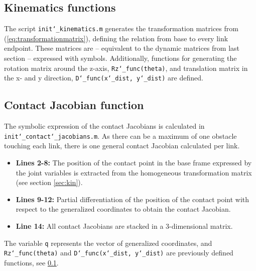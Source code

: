 \subsection{Kinematics functions}\label{subseq:kinfunc}

The script \texttt{init\char`_kinematics.m} generates the transformation matrices from (\ref{eq:transformationmatrix}), defining the relation from base to every link endpoint. These matrices are -- equivalent to the dynamic matrices from last section -- expressed with symbols. Additionally, functions for generating the rotation matrix around the z-axis, \texttt{Rz\char`_func(theta)}, and translation matrix in the x- and y direction, \texttt{D\char`_func(x\char`_dist, y\char`_dist)} are defined.


\subsection{Contact Jacobian function}\label{subseq:Jcfunc}
The symbolic expression of the contact Jacobians is calculated in \\ \texttt{init\char`_contact\char`_jacobians.m}. As there can be a maximum of one obstacle touching each link, there is one general contact Jacobian calculated per link.

\begin{itemize}
    \item \textbf{Lines 2-8:} The position of the contact point in the base frame expressed by the joint variables is extracted from the homogeneous transformation matrix (see section \ref{sec:kin}).
    \item\textbf{Lines 9-12:} Partial differentiation of the position of the contact point with respect to the generalized coordinates to obtain the contact Jacobian.
    \item \textbf{Line 14:} All contact Jacobians are stacked in a 3-dimensional matrix.
\end{itemize}

The variable \texttt{q} represents the vector of generalized coordinates, and \\ \texttt{Rz\char`_func(theta)} and \texttt{D\char`_func(x\char`_dist, y\char`_dist)} are previously defined functions, see \ref{subseq:kinfunc}.



